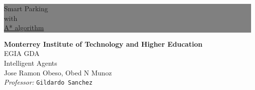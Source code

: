\thispagestyle{empty} %


\colorbox{grey}{
	\parbox[t]{1.0\linewidth}{
		\centering \fontsize{50pt}{80pt}\selectfont %
		\vspace*{0.7cm} %
		
		\hfill Smart Parking \\
		\hfill with \\
		\hfill \underline{A* algorithm}\par
		
		\vspace*{0.7cm} %
	}
}


\vfill %


{\centering \large 
\hfill \textbf{Monterrey Institute of Technology and Higher Education} \\
\hfill EGIA GDA \\
\hfill Intelligent Agents \\
\hfill Jose Ramon Obeso, Obed N Munoz \\
\hfill \textit{Professor:} \texttt{Gildardo Sanchez} \\

\HRule{1pt}} %


\clearpage %
